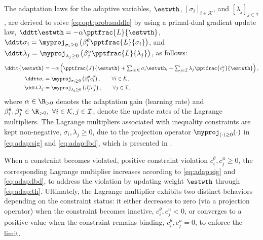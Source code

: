 \documentclass[letterpaper, journal]{IEEEtran}
\begin{document}
The adaptation laws for the adaptive variables, $\estwth$, $[\sigma_i]_{i\in\mathcal{K}}$, and $[\lambda_j]_{j\in\mathcal{I}}$, are derived to solve \eqref{eq:opt:prob:saddle} by using a primal-dual gradient update law, \ie 
$
  \ddtt\estwth 
  = 
  -\alpha \pptfrac{L}{\estwth}
$, $
  \ddtt\sigma_i 
  = 
  \myproj_{\sigma_i\ge0}
  \left(
      \beta_i^\theta 
      \pptfrac{L}{\sigma_i}
  \right)
$, and $
  \ddtt\lambda_j 
  = 
  \myproj_{\lambda_j\ge0}
  \left(
    \beta_j^u 
    \pptfrac{L}{\lambda_j}
  \right)
$, as follows:
\begin{subequations} \label{eq:adap}
  \begin{align}
    \ddtt{\estwth}
    &
    =
    -\alpha 
    \left(
      \pptfrac{J}{\estwth}
      +
      \textstyle\sum_{i\in\mathcal{K}}
      \sigma_i 
      \estwth_i
      +
      \textstyle\sum_{j\in\mathcal{I}}
      \lambda_j 
      \pptfrac{c^{u}_{j}}{\estwth}
    \right),
    \label{eq:adap:th}
    \\
    \ddtt\sigma_i
    & 
    = 
    \myproj_{\sigma_i\ge0}
      \left(
      \beta_i^{\theta}
      c^{\theta}_{i} 
    \right)
    ,
    \qquad \forall i\in\mathcal{K},
    \label{eq:adap:sig}
    \\
    \ddtt\lambda_j
    & 
    = 
    \myproj_{\lambda_j\ge0}
      \left(
      \beta_j^{u}
      c^{u}_{j} 
    \right)
    ,
    \qquad \forall j\in\mathcal{I},
    \label{eq:adap:lbd}
  \end{align}%
\end{subequations}
where $\alpha\in\R_{>0}$ denotes the adaptation gain (learning rate) and $\beta_i^{\theta},\beta_j^{u}\in\R_{>0},\ \forall i\in\mathcal{K},j\in\mathcal{I}$, denote the update rates of the Lagrange multipliers. 
The Lagrange multipliers associated with inequality constraints are kept non-negative, \ie $\sigma_i,\lambda_j\ge 0$, due to the projection operator $\myproj_{(\cdot)\ge0}(\cdot)$ in \eqref{eq:adap:sig} and \eqref{eq:adap:lbd}, which is presented in \cite[Appendix E, eq. (E.4)]{Krstic:1995aa}.

When a constraint becomes violated, \ie positive constraint violation $c^{\theta}_{i},c^{u}_{j}\ge0$, the corresponding Lagrange multiplier increases according to \eqref{eq:adap:sig} and \eqref{eq:adap:lbd}, to address the violation by updating weight $\estwth$ through \eqref{eq:adap:th}.
Ultimately, the Lagrange multiplier exhibits two distinct behaviors depending on the constraint status: it either decreases to zero (\eg via a projection operator) when the constraint becomes inactive, $c^{\theta}_i,c^{u}_j < 0$, or converges to a positive value when the constraint remains binding, $c^{\theta}_i,c^{u}_j = 0$, to enforce the limit.
\end{document}
